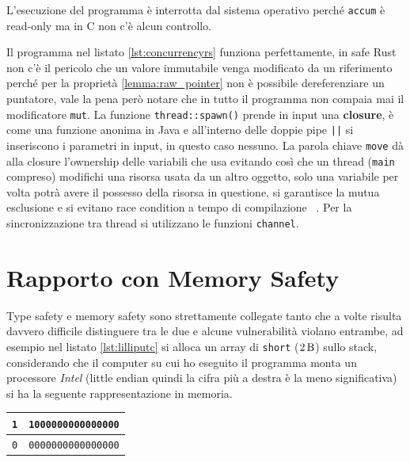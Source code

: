 \documentclass[Lau,binding=0.6cm]{sapthesis}
\newcommand{\textcode}[1]{\colorbox{backcolour}{\texttt{#1}}}
\begin{document}
L'esecuzione del programma è interrotta dal sistema operativo perché \textcode{accum} è read-only ma in C non c'è alcun controllo.




Il programma nel listato \ref{lst:concurrencyrs} funziona perfettamente, in safe Rust non c'è il pericolo che un valore immutabile venga modificato da un riferimento perché per la proprietà \ref{lemma:raw_pointer} non è possibile dereferenziare un puntatore, vale la pena però notare che in tutto il programma non compaia mai il modificatore \textcode{mut}. La funzione \textcode{thread::spawn()} prende in input una \textbf{closure}, è come una funzione anonima in Java e all'interno delle doppie pipe \textcode{||} si inseriscono i parametri in input, in questo caso nessuno. 
La parola chiave \textcode{move} dà alla closure l'ownership delle variabili che usa evitando così che un thread (\textcode{main} compreso) modifichi una risorsa usata da un altro oggetto, solo una variabile per volta potrà avere il possesso della risorsa in questione, si garantisce la mutua esclusione e si evitano race condition a tempo di compilazione ~\cite[5.6]{rust:language_2}. 
Per la sincronizzazione tra thread si utilizzano le funzioni \colorbox{backcolour}{\texttt{channel}}. 




\section{Rapporto con Memory Safety}
Type safety e memory safety sono strettamente collegate tanto che a volte risulta davvero difficile distinguere tra le due e alcune vulnerabilità violano entrambe, ad esempio nel listato \ref{lst:lilliputc} si alloca un array di \textcode{short} ($ \SI{2}{\byte} $) sullo stack, considerando che il computer su cui ho eseguito il programma monta un processore \textit{Intel} (little endian quindi la cifra più a destra è la meno significativa) si ha la seguente rappresentazione in memoria.

\begin{table}[H]
	\label{fig:mem_type_stack}
	\centering
	\begin{tabular}{|c|c|}
		\hline
		\texttt{1} & \texttt{1000000000000000} \\
		\hline 
		\texttt{0} & \texttt{0000000000000000} \\
		\hline
	\end{tabular}
\end{table}
\end{document}
